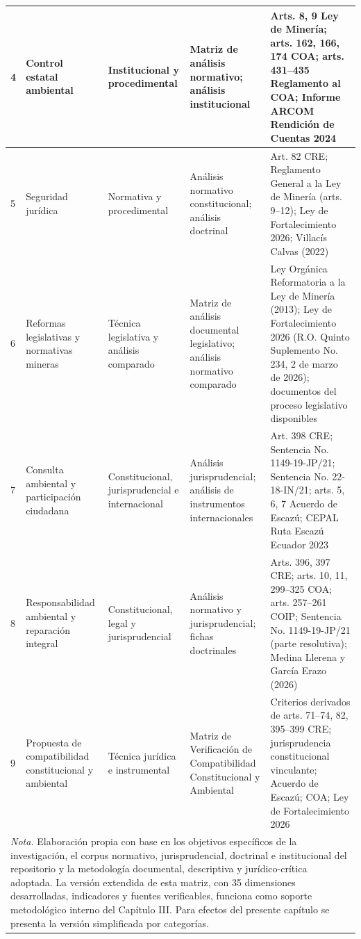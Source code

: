 \begin{longtable}{|p{}|p{}|p{}|p{}|p{}|}
4 &
Control estatal ambiental &
Institucional y procedimental &
Matriz de análisis normativo; análisis institucional &
Arts. 8, 9 Ley de Minería; arts. 162, 166, 174 COA; arts. 431--435 Reglamento al COA; Informe ARCOM Rendición de Cuentas 2024 \\
\hline

5 &
Seguridad jurídica &
Normativa y procedimental &
Análisis normativo constitucional; análisis doctrinal &
Art. 82 CRE; Reglamento General a la Ley de Minería (arts. 9--12); Ley de Fortalecimiento 2026; Villacís Calvas (2022) \\
\hline

6 &
Reformas legislativas y normativas mineras &
Técnica legislativa y análisis comparado &
Matriz de análisis documental legislativo; análisis normativo comparado &
Ley Orgánica Reformatoria a la Ley de Minería (2013); Ley de Fortalecimiento 2026 (R.O. Quinto Suplemento No. 234, 2 de marzo de 2026); documentos del proceso legislativo disponibles \\
\hline

7 &
Consulta ambiental y participación ciudadana &
Constitucional, jurisprudencial e internacional &
Análisis jurisprudencial; análisis de instrumentos internacionales &
Art. 398 CRE; Sentencia No. 1149-19-JP/21; Sentencia No. 22-18-IN/21; arts. 5, 6, 7 Acuerdo de Escazú; CEPAL Ruta Escazú Ecuador 2023 \\
\hline

8 &
Responsabilidad ambiental y reparación integral &
Constitucional, legal y jurisprudencial &
Análisis normativo y jurisprudencial; fichas doctrinales &
Arts. 396, 397 CRE; arts. 10, 11, 299--325 COA; arts. 257--261 COIP; Sentencia No. 1149-19-JP/21 (parte resolutiva); Medina Llerena y García Erazo (2026) \\
\hline

9 &
Propuesta de compatibilidad constitucional y ambiental &
Técnica jurídica e instrumental &
Matriz de Verificación de Compatibilidad Constitucional y Ambiental &
Criterios derivados de arts. 71--74, 82, 395--399 CRE; jurisprudencia constitucional vinculante; Acuerdo de Escazú; COA; Ley de Fortalecimiento 2026 \\
\hline

\multicolumn{5}{p{0.9\textwidth}}{\small\textit{Nota.} Elaboración propia con base en los objetivos específicos de la investigación, el corpus normativo, jurisprudencial, doctrinal e institucional del repositorio y la metodología documental, descriptiva y jurídico-crítica adoptada. La versión extendida de esta matriz, con 35 dimensiones desarrolladas, indicadores y fuentes verificables, funciona como soporte metodológico interno del Capítulo III. Para efectos del presente capítulo se presenta la versión simplificada por categorías.} \\

\end{longtable}
\endgroup

